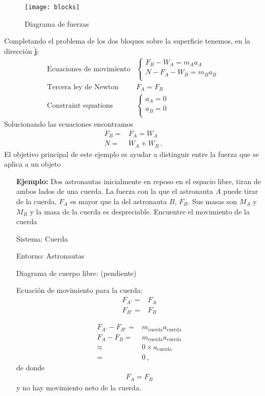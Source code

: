 \begin{figure}
  \centering
  \texttt{[image: blocks]}
  \caption{Diagrama de fuerzas}
  \label{fig:blocks}
\end{figure}

Completando el problema de los dos bloques sobre la superficie tenemos, en la direcci\'on $\hat{\mathbf{j}}$:
\begin{align}
  \text{Ecuaciones de movimiento}&
  \begin{cases}
F_B-W_A=m_A a_A\\
N-F_A-W_B=m_B a_B\\
  \end{cases}\nonumber\\
\text{Tercera ley de Newton}\quad &F_A=F_B\nonumber\\
\text{Constraint equations}&
\begin{cases}
a_A=0\\
a_B=0\\  
\end{cases}
\end{align}
Solucionando las ecuaciones encontramos
\begin{align}
  F_B=&F_A=W_A\nonumber\\
  N=&W_A+W_B\,.
\end{align}
El objetivo principal de este ejemplo es ayudar a distinguir entre la fuerza que se aplica a un objeto 


\begin{itemize}
\item[\textbf{Ejemplo:}] Dos astronautas inicialmente en reposo en el espacio libre, tiran de ambos lados de una cuerda. La fuerza con la que el astronauta $A$ puede tirar de la cuerda, $F_A$ es mayor que la del astronauta $B$, $F_B$. Sus masas son $M_A$ y $M_B$ y la masa de la cuerda es despreciable. Encuentre el movimiento de la cuerda

Sistema: Cuerda

Entorno: Astronautas

Diagrama de cuerpo libre: (pendiente)

Ecuación de movimiento para la cuerda:
\begin{align}
  {F}_{A'}=&F_{A}\nonumber\\
  {F}_{B'}=&F_{B}
\end{align}

\begin{align}
  F_{A'}-F_{B'}=&m_{\text{cuerda}} a_{\text{cuerda}}\nonumber\\
  F_{A}-F_{B}=&m_{\text{cuerda}} a_{\text{cuerda}}\nonumber\\
\approx&0\times a_{\text{cuerda}}\nonumber\\
=&0\,,
\end{align}
de donde
\begin{align}
  F_A=F_B
\end{align}
y no hay movimiento neto de la cuerda.
\end{itemize}

